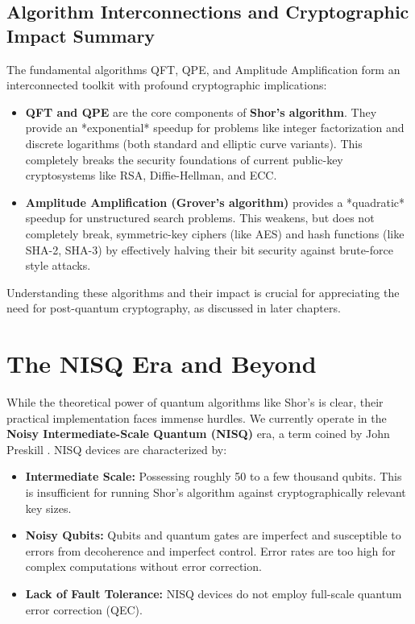 \subsection{Algorithm Interconnections and Cryptographic Impact Summary}\label{subsec:algo_connections}
The fundamental algorithms QFT, QPE, and Amplitude Amplification form an interconnected toolkit with profound cryptographic implications:
\begin{itemize}
    \item \textbf{QFT and QPE} are the core components of \textbf{Shor's algorithm}. They provide an *exponential* speedup for problems like integer factorization and discrete logarithms (both standard and elliptic curve variants). This completely breaks the security foundations of current public-key cryptosystems like RSA, Diffie-Hellman, and ECC.
    \item \textbf{Amplitude Amplification (Grover's algorithm)} provides a *quadratic* speedup for unstructured search problems. This weakens, but does not completely break, symmetric-key ciphers (like AES) and hash functions (like SHA-2, SHA-3) by effectively halving their bit security against brute-force style attacks.
\end{itemize}
Understanding these algorithms and their impact is crucial for appreciating the need for post-quantum cryptography, as discussed in later chapters.


\section{The NISQ Era and Beyond}\label{sec:nisq_era}
While the theoretical power of quantum algorithms like Shor's is clear, their practical implementation faces immense hurdles. We currently operate in the \textbf{Noisy Intermediate-Scale Quantum (NISQ)} era, a term coined by John Preskill \parencite{preskill2018quantum}. NISQ devices are characterized by:
\begin{itemize}
    \item \textbf{Intermediate Scale:} Possessing roughly 50 to a few thousand qubits. This is insufficient for running Shor's algorithm against cryptographically relevant key sizes.
    \item \textbf{Noisy Qubits:} Qubits and quantum gates are imperfect and susceptible to errors from decoherence and imperfect control. Error rates are too high for complex computations without error correction.
    \item \textbf{Lack of Fault Tolerance:} NISQ devices do not employ full-scale quantum error correction (QEC).
\end{itemize}

